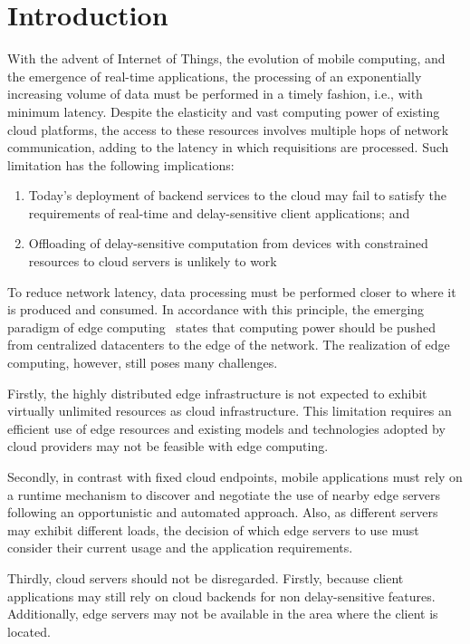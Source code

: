 \section{Introduction}

With the advent of Internet of Things, the evolution of mobile computing, and the emergence of real-time applications, the processing of an exponentially increasing volume of data must be performed in a timely fashion, i.e., with minimum latency. Despite the elasticity and vast computing power of existing cloud platforms, the access to these resources involves multiple hops of network communication, adding to the latency in which requisitions are processed. Such limitation has the following implications:

\begin{enumerate}

\item Today's deployment of backend services to the cloud may fail to satisfy the requirements of real-time and delay-sensitive client applications; and

\item Offloading of delay-sensitive computation from devices with constrained resources to cloud servers is unlikely to work

\end{enumerate}

To reduce network latency, data processing must be performed closer to where it is produced and consumed. In accordance with this principle, the emerging paradigm of edge computing~\cite{} states that computing power should be pushed from centralized datacenters to the edge of the network. The realization of edge computing, however, still poses many challenges. 

Firstly, the highly distributed edge infrastructure is not expected to exhibit virtually unlimited resources as cloud infrastructure. This limitation requires an efficient use of edge resources and existing models and technologies adopted by cloud providers may not be feasible with edge computing.

Secondly, in contrast with fixed cloud endpoints, mobile applications must rely on a runtime mechanism to discover and negotiate the use of nearby edge servers following an opportunistic and automated approach. Also, as different servers may exhibit different loads, the decision of which edge servers to use must consider their current usage and the application requirements.

Thirdly, cloud servers should not be disregarded. Firstly, because client applications may still rely on cloud backends for non delay-sensitive features. Additionally, edge servers may not be available in the area where the client is located. 

